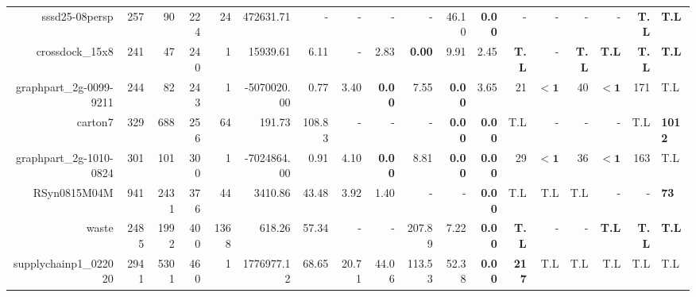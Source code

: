 \begin{table*}[t]
\begin{tabular}{|r|r|r|r|r||r||r|r|r|r|r||r|r|r|r|r|r|}
                    sssd25-08persp &          257 &            90 &          224 &            24 &           472631.71 &              - &              - &             - &              - &         46.10 & \textbf{0.00} &                  - &                  - &                  - &                  - & \textbf{T.L} & \textbf{T.L} \\ 
                   crossdock\_15x8 &          241 &            47 &          240 &             1 &            15939.61 &           6.11 &              - &          2.83 &  \textbf{0.00} &          9.91 &          2.45 &       \textbf{T.L} &                  - &       \textbf{T.L} &       \textbf{T.L} & \textbf{T.L} & \textbf{T.L} \\ 
           graphpart\_2g-0099-9211 &          244 &            82 &          243 &             1 &         -5070020.00 &           0.77 &           3.40 & \textbf{0.00} &           7.55 & \textbf{0.00} &          3.65 &                 21 &         $\bm{< 1}$ &                 40 &         $\bm{< 1}$ &          171 &          T.L \\ 
                           carton7 &          329 &           688 &          256 &            64 &              191.73 &         108.83 &              - &             - &              - & \textbf{0.00} & \textbf{0.00} &                T.L &                  - &                  - &                  - &          T.L &\textbf{1012} \\ 
           graphpart\_2g-1010-0824 &          301 &           101 &          300 &             1 &         -7024864.00 &           0.91 &           4.10 & \textbf{0.00} &           8.81 & \textbf{0.00} & \textbf{0.00} &                 29 &         $\bm{< 1}$ &                 36 &         $\bm{< 1}$ &          163 &          T.L \\ 
                      RSyn0815M04M &          941 &          2431 &          376 &            44 &             3410.86 &          43.48 &           3.92 &          1.40 &              - &             - & \textbf{0.00} &                T.L &                T.L &                T.L &                  - &            - &  \textbf{73} \\ 
                             waste &         2485 &          1992 &          400 &          1368 &              618.26 &          57.34 &              - &             - &         207.89 &          7.22 & \textbf{0.00} &       \textbf{T.L} &                  - &                  - &       \textbf{T.L} & \textbf{T.L} & \textbf{T.L} \\ 
             supplychainp1\_022020 &         2941 &          5301 &          460 &             1 &          1776977.12 &          68.65 &          20.71 &         44.06 &         113.53 &         52.38 & \textbf{0.00} &       \textbf{217} &                T.L &                T.L &                T.L &          T.L &          T.L \\ 
\hline 
\end{tabular}\\ 
\label{table:results} 
\end{table*} 
 
